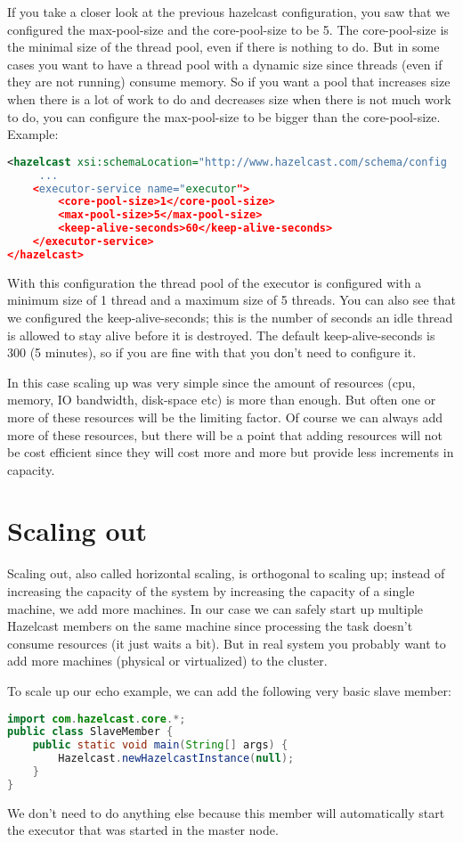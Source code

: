If you take a closer look at the previous hazelcast configuration, you saw that we configured the max-pool-size and the core-pool-size to be 5. The core-pool-size is the minimal size of the thread pool, even if there is nothing to do. But in some cases you want to have a thread pool with a dynamic size since threads (even if they are not running) consume memory. So if you want a pool that increases size when there is a lot of work to do and decreases size when there is not much work to do, you can configure the max-pool-size to be bigger than the core-pool-size. Example:
\begin{lstlisting}[language=xml]
<hazelcast xsi:schemaLocation="http://www.hazelcast.com/schema/config
     ...  
    <executor-service name="executor">
        <core-pool-size>1</core-pool-size> 
        <max-pool-size>5</max-pool-size>
        <keep-alive-seconds>60</keep-alive-seconds>
    </executor-service>
</hazelcast>
\end{lstlisting}
With this configuration the thread pool of the executor is configured with a minimum size of 1 thread and a maximum size of 5 threads. You can also see that we configured the keep-alive-seconds; this is the number of seconds an idle thread is allowed to stay alive before it is destroyed. The default keep-alive-seconds is 300 (5 minutes), so if you are fine with that you don't need to configure it.

In this case scaling up was very simple since the amount of resources (cpu, memory, IO bandwidth, disk-space etc) is more than enough. But often one or more of these resources will be the limiting factor. Of course we can always add more of these resources, but there will be a point that adding resources will not be cost efficient since they will cost more and more but provide less increments in capacity.

\section{Scaling out}
Scaling out, also called horizontal scaling, is orthogonal to scaling up; instead of increasing the capacity of the system by increasing the capacity of a single machine, we add more machines. In our case we can safely start up multiple Hazelcast members on the same machine since processing the task doesn't consume resources (it just waits a bit). But in real system you probably want to add more machines (physical or virtualized) to the cluster.

To scale up our echo example, we can add the following very basic slave member:
\begin{lstlisting}[language=java]
import com.hazelcast.core.*;
public class SlaveMember {
    public static void main(String[] args) {
        Hazelcast.newHazelcastInstance(null);
    }
}
\end{lstlisting}
We don't need to do anything else because this member will automatically start the executor that was started in the master node.

